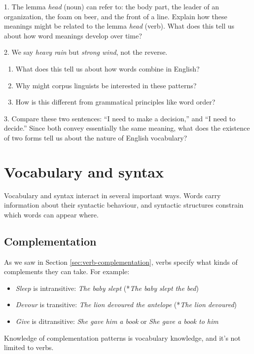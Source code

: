 \begin{tcolorbox}[title=Exercise: Meaning and Use, colback=white, colframe=purple!75!black, fonttitle=\bfseries]
1. The lemma \textit{head} (noun) can refer to: the body part, the leader of an organization, the foam on beer, and the front of a line. Explain how these meanings might be related to the lemma \textit{head} (verb). What does this tell us about how word meanings develop over time?

2. We say \textit{heavy rain} but \textit{strong wind}, not the reverse. 
 \begin{enumerate}[nosep]
 \item What does this tell us about how words combine in English?
 \item Why might corpus linguists be interested in these patterns?
 \item How is this different from grammatical principles like word order?
 \end{enumerate}

3. Compare these two sentences: ``I need to make a decision,'' and ``I need to decide.'' Since both convey essentially the same meaning, what does the existence of two forms tell us about the nature of English vocabulary?
\end{tcolorbox}

\section{Vocabulary and syntax} \label{sec:vocab-syntax}

Vocabulary and syntax interact in several important ways. Words carry information about their syntactic behaviour, and syntactic structures constrain which words can appear where.

\subsection{Complementation}\label{ssec:complementation}

As we saw in Section \ref{sec:verb-complementation}, verbs specify what kinds of complements they can take. For example:
\begin{itemize}[noitemsep]
\item \textit{Sleep} is intransitive: \textit{The baby slept} (*\textit{The baby slept the bed})
\item \textit{Devour} is transitive: \textit{The lion devoured the antelope} (*\textit{The lion devoured})
\item \textit{Give} is ditransitive: \textit{She gave him a book} or \textit{She gave a book to him}
\end{itemize}
Knowledge of complementation patterns is vocabulary knowledge, and it's not limited to verbs.

